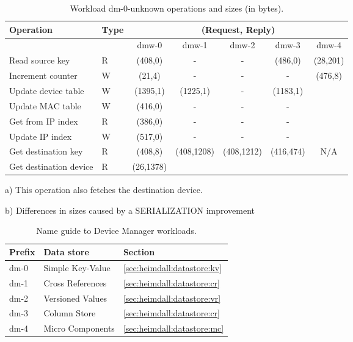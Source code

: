 \begin{table}[ht]
\small
\centering 
\begin{threeparttable}
\begin{tabular}{ll ccccc}
 Operation & Type &  \multicolumn{5}{c}{ (Request, Reply) } \\  \midrule
&  & dmw-0 & dmw-1  & dmw-2 & dmw-3 & dmw-4 \\ \toprule 
Read source key & R & (408,0) & - & - & (486,0) & (28,201)\tnote{a}\\
Increment counter & W & (21,4) & -  & - & - & \multirow{5}{*}{(476,8)} \\
Update device table & W & (1395,1) & (1225,1)\tnote{b}  & - &
(1183,1) & \\
Update MAC  table & W & (416,0) & - & - & -
& \\
Get from IP index & R & (386,0) & - & - & - & \\
Update IP index  & W & (517,0) & - & - & - & \\
Get destination key & R & (408,8) &
\multirow{2}{*}{(408,1208)}\tnote{b} & \multirow{2}{*}{(408,1212)} &
\multirow{2}{*}{(416,474)} & \multirow{2}{*}{N/A}  \\ 
Get destination device & R & (26,1378)  &  & & \\\bottomrule
\end{tabular}
\caption[Workload dm-0-unknown operations]{Workload dm-0-unknown operations
  and sizes (in bytes).}\label{table:dm-unknown-optimizations}
\begin{tablenotes}
\item [a)] This operation also fetches the destination device.
\item [b)] Differences in sizes caused by a SERIALIZATION improvement 
\end{tablenotes}
\end{threeparttable}
\end{table}


\begin{table}
\small
\begin{tabular}{lll} 
    Prefix &  Data store & Section\\\toprule
    dm-0 & Simple Key-Value  & \ref{sec:heimdall:datastore:kv}  \\
    dm-1 & Cross References  & \ref{sec:heimdall:datastore:cr} \\
    dm-2 & Versioned Values & \ref{sec:heimdall:datastore:vr} \\
    dm-3 & Column Store & \ref{sec:heimdall:datastore:cr} \\
    dm-4 & Micro Components & \ref{sec:heimdall:datastore:mc} \\ 
  \end{tabular}
  \caption[Name guide to Device Manager workloads]{Name guide to
    Device Manager workloads.}
  \label{table:names:dm}
\end{table}


